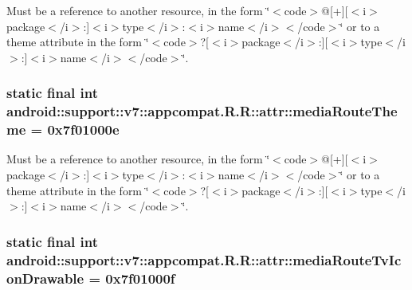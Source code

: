 Must be a reference to another resource, in the form \char`\"{}$<$code$>$@\mbox{[}+\mbox{]}\mbox{[}$<$i$>$package$<$/i$>$:\mbox{]}$<$i$>$type$<$/i$>$:$<$i$>$name$<$/i$>$$<$/code$>$\char`\"{} or to a theme attribute in the form \char`\"{}$<$code$>$?\mbox{[}$<$i$>$package$<$/i$>$:\mbox{]}\mbox{[}$<$i$>$type$<$/i$>$:\mbox{]}$<$i$>$name$<$/i$>$$<$/code$>$\char`\"{}. \hypertarget{classandroid_1_1support_1_1v7_1_1appcompat_1_1_r_1_1attr_ee03ba1905c5216a025b08f333e5906d}{
\subsubsection[{mediaRouteTheme}]{\setlength{\rightskip}{0pt plus 5cm}static final int android::support::v7::appcompat.R.R::attr::mediaRouteTheme = 0x7f01000e}}
\label{classandroid_1_1support_1_1v7_1_1appcompat_1_1_r_1_1attr_ee03ba1905c5216a025b08f333e5906d}


Must be a reference to another resource, in the form \char`\"{}$<$code$>$@\mbox{[}+\mbox{]}\mbox{[}$<$i$>$package$<$/i$>$:\mbox{]}$<$i$>$type$<$/i$>$:$<$i$>$name$<$/i$>$$<$/code$>$\char`\"{} or to a theme attribute in the form \char`\"{}$<$code$>$?\mbox{[}$<$i$>$package$<$/i$>$:\mbox{]}\mbox{[}$<$i$>$type$<$/i$>$:\mbox{]}$<$i$>$name$<$/i$>$$<$/code$>$\char`\"{}. \hypertarget{classandroid_1_1support_1_1v7_1_1appcompat_1_1_r_1_1attr_c61edf7cefd87a49e2c7635bdd74029c}{
\subsubsection[{mediaRouteTvIconDrawable}]{\setlength{\rightskip}{0pt plus 5cm}static final int android::support::v7::appcompat.R.R::attr::mediaRouteTvIconDrawable = 0x7f01000f}}
\label{classandroid_1_1support_1_1v7_1_1appcompat_1_1_r_1_1attr_c61edf7cefd87a49e2c7635bdd74029c}


